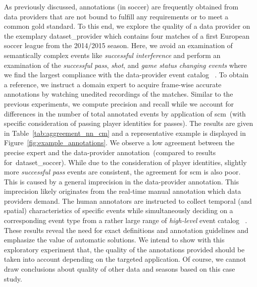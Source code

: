 As previously discussed, annotations (in soccer) are frequently obtained from data providers that are not bound to fulfill any requirements or to meet a common gold standard.
To this end, we explore the quality of a data provider on the exemplary \acrfull{dataset_provider} which contains four matches of a first European soccer league from the 2014/2015 season. Here, we avoid an examination of semantically complex events like \textit{successful interference} %
and perform an examination of the \textit{successful pass}, \textit{shot}, and \textit{game status changing events} where we find the largest compliance with the data-provider event catalog ~\cite{liu2013reliability}. To obtain a reference, we instruct a domain expert to acquire frame-wise accurate annotations by watching unedited recordings of the matches. 
Similar to the previous experiments, we compute precision and recall while we account for differences in the number of total annotated events by application of \acrshort{scm}~(with specific consideration of passing player identities for passes). The results are given in Table~\ref{tab:aggreement_nn_cm} and a representative example is displayed in Figure~\ref{fig:example_annotations}.
We observe a low agreement between the precise expert and the data-provider annotation~(compared to results for~\acrshort{dataset_soccer}). While due to the consideration of player identities, slightly more \textit{successful pass} events are consistent, the agreement for \acrshort{scm} is also poor.
This is caused by a general imprecision in the data-provider annotation. This imprecision likely originates from the real-time manual annotation which data providers demand. The human annotators are instructed to collect temporal (and spatial) characteristics of specific events while simultaneously deciding on a corresponding event type from a rather large range of \textit{high-level} event catalog ~\cite{liu2013reliability}. 
These results reveal the need for exact definitions and annotation guidelines and emphasize the value of automatic solutions.
We intend to show with this exploratory experiment that, the quality of the annotations provided should be taken into account depending on the targeted application. 
Of course, we cannot draw conclusions about quality of other data and seasons based on this case study.

